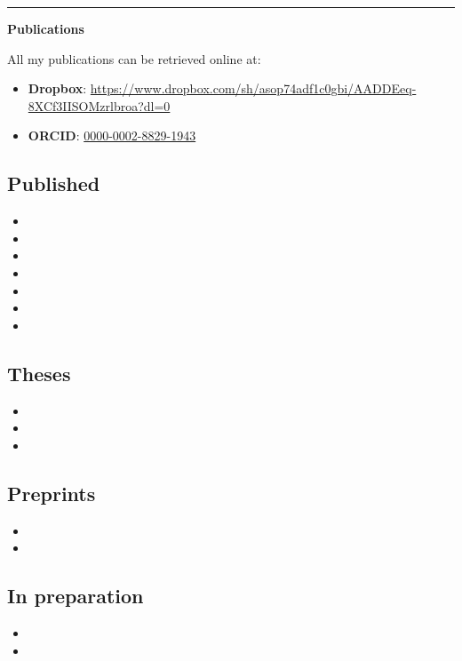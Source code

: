 \documentclass[a4paper]{article}
\newcommand{\block}[1]{\hrule \vspace{0.2cm} \textbf{\Large #1} \vspace{0.2cm}}
\begin{document}
	{\block{Publications}

	All my publications can be retrieved online at:
	\begin{itemize}[leftmargin=*, itemsep=0pt, parsep=0pt, topsep=0pt, partopsep=0pt]
		\item[$\cdot$] \textbf{Dropbox}: \url{https://www.dropbox.com/sh/asop74adf1c0gbi/AADDEeq-8XCf3IISOMzrlbroa?dl=0}
		\item[$\cdot$] \textbf{ORCID}: \href{https://orcid.org/0000-0002-8829-1943}{0000-0002-8829-1943}
	\end{itemize}

	
	\subsection*{Published}
\begin{itemize}
\item {}
\item {}
\item {}
\item {}
\item {}
\item {}
\item {}
\end{itemize}
\subsection*{Theses}
\begin{itemize}
\item {}
\item {}
\item {}
\end{itemize}
\subsection*{Preprints}
\begin{itemize}
\item {}
\item {}
\end{itemize}
\subsection*{In preparation}
\begin{itemize}
\item {}
\item {}
\end{itemize}	}
\end{document}
